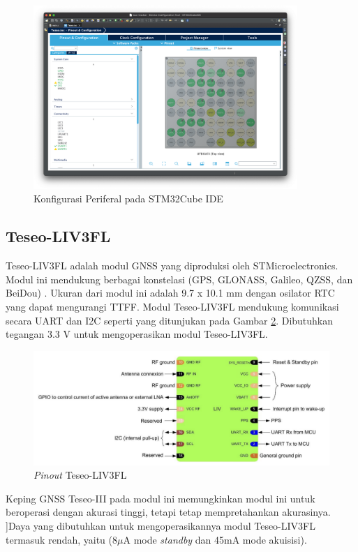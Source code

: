 \begin{figure}[ht]
	\centering
	\includegraphics[width=10cm]{contents/chapter-2/stm32-mx.png}
	\caption{Konfigurasi Periferal pada STM32Cube IDE}
	\label{Fig: stm32-mx}
\end{figure}

\subsection{Teseo-LIV3FL}
Teseo-LIV3FL adalah modul GNSS yang diproduksi oleh STMicroelectronics. Modul ini mendukung berbagai konstelasi (GPS, GLONASS, Galileo, QZSS, dan BeiDou) \cite{STMicroelectronics2022}.
Ukuran dari modul ini adalah 9.7 x 10.1 mm dengan osilator RTC yang dapat mengurangi TTFF. Modul Teseo-LIV3FL mendukung komunikasi secara UART dan I2C seperti yang ditunjukan pada Gambar \ref{Fig: teseo_pinout}. Dibutuhkan tegangan 3.3 V untuk mengoperasikan modul Teseo-LIV3FL.

\begin{figure}[ht]
	\centering
	\includegraphics[width=13cm]{contents/chapter-2/teseo_pinout.png}
	\caption{\textit{Pinout} Teseo-LIV3FL \cite{STMicroelectronics2022a}}
	\label{Fig: teseo_pinout}
\end{figure}

Keping GNSS Teseo-III pada modul ini memungkinkan modul ini untuk beroperasi dengan akurasi tinggi, tetapi tetap mempretahankan akurasinya. ]Daya yang dibutuhkan untuk mengoperasikannya modul Teseo-LIV3FL termasuk rendah, yaitu (8$\mu$A mode \textit{standby} dan 45mA mode akuisisi).

